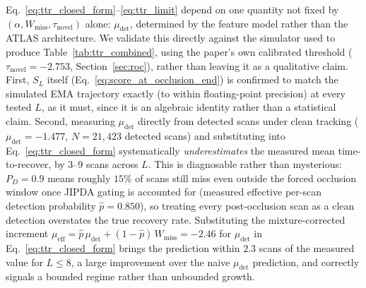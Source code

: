 \documentclass[conference]{IEEEtran}
\begin{document}
Eq.~\eqref{eq:ttr_closed_form}--\eqref{eq:ttr_limit} depend on one quantity not fixed by $(\alpha, W_{\text{miss}}, \tau_{\text{novel}})$ alone: $\mu_{\text{det}}$, determined by the feature model rather than the ATLAS architecture. We validate this directly against the simulator used to produce Table~\ref{tab:ttr_combined}, using the paper's own calibrated threshold ($\tau_{\text{novel}} = -2.753$, Section~\ref{sec:roc}), rather than leaving it as a qualitative claim. First, $S_L$ itself (Eq.~\eqref{eq:score_at_occlusion_end}) is confirmed to match the simulated EMA trajectory exactly (to within floating-point precision) at every tested $L$, as it must, since it is an algebraic identity rather than a statistical claim. Second, measuring $\mu_{\text{det}}$ directly from detected scans under clean tracking ($\mu_{\text{det}} = -1.477$, $N=21{,}423$ detected scans) and substituting into Eq.~\eqref{eq:ttr_closed_form} systematically \emph{underestimates} the measured mean time-to-recover, by 3--9 scans across $L$. This is diagnosable rather than mysterious: $P_D = 0.9$ means roughly $15\%$ of scans still miss even outside the forced occlusion window once JIPDA gating is accounted for (measured effective per-scan detection probability $\hat p = 0.850$), so treating every post-occlusion scan as a clean detection overstates the true recovery rate. Substituting the mixture-corrected increment $\mu_{\text{eff}} = \hat p\,\mu_{\text{det}} + (1-\hat p)\,W_{\text{miss}} = -2.46$ for $\mu_{\text{det}}$ in Eq.~\eqref{eq:ttr_closed_form} brings the prediction within $2.3$ scans of the measured value for $L \le 8$, a large improvement over the naive $\mu_{\text{det}}$ prediction, and correctly signals a bounded regime rather than unbounded growth.
\end{document}
